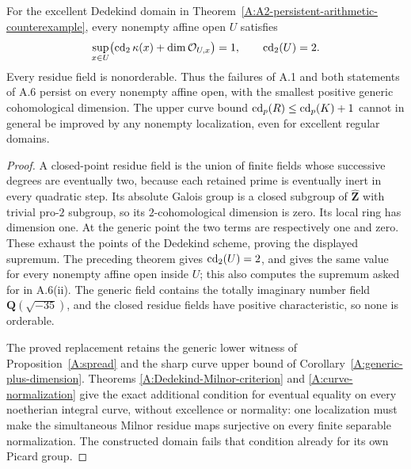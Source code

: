 \begin{corollary}
\label{A:A2-sharp-curve-consequences}
For the excellent Dedekind domain in
Theorem~\ref{A:A2-persistent-arithmetic-counterexample}, every nonempty
affine open $U$ satisfies
\[
 \sup_{x\in U}\bigl(\operatorname{cd}_2\kappa(x)+\dim\mathcal O_{U,x}\bigr)=1,
 \qquad \operatorname{cd}_2(U)=2.
\]
Every residue field is nonorderable. Thus the failures of A.1 and
both statements of A.6 persist on every nonempty affine open, with
the smallest positive generic cohomological dimension. The upper
curve bound $\operatorname{cd}_p(R)\leq\operatorname{cd}_p(K)+1$ cannot in general be improved
by any nonempty localization, even for excellent regular domains.
\end{corollary}
\begin{proof}
A closed-point residue field is the union of finite fields whose
successive degrees are eventually two, because each retained prime
is eventually inert in every quadratic step. Its absolute Galois
group is a closed subgroup of $\widehat{\mathbf Z}$ with trivial
pro-$2$ subgroup, so its $2$-cohomological dimension is zero.
Its local ring has dimension one. At the generic point the two
terms are respectively one and zero. These exhaust the points of
the Dedekind scheme, proving the displayed supremum. The preceding
theorem gives $\operatorname{cd}_2(U)=2$, and gives the same value for every
nonempty affine open inside $U$; this also computes the supremum
asked for in A.6(ii). The generic field contains the totally
imaginary number field $\mathbf Q(\sqrt{-35})$, and the closed
residue fields have positive characteristic, so none is orderable.

The proved replacement retains the generic lower witness of
Proposition~\ref{A:spread} and the sharp curve upper bound of
Corollary~\ref{A:generic-plus-dimension}. Theorems
\ref{A:Dedekind-Milnor-criterion} and \ref{A:curve-normalization}
give the exact additional condition for eventual equality on
every noetherian integral curve, without excellence or normality:
one localization must make the simultaneous Milnor residue maps
surjective on every finite separable normalization. The constructed
domain fails that condition already for its own Picard group.
\end{proof}
